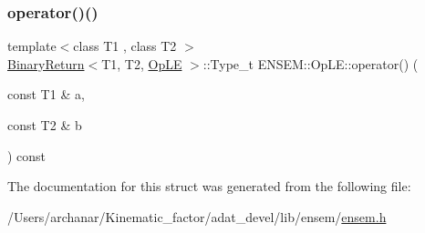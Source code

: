 \mbox{\label{structENSEM_1_1OpLE_aecbfd8b265536bef6bc1dc2a124858ae}} 
\subsubsection{\texorpdfstring{operator()()}{operator()()}\hspace{0.1cm}{\footnotesize\ttfamily [2/2]}}
{\footnotesize\ttfamily template$<$class T1 , class T2 $>$ \\
\mbox{\hyperlink{structENSEM_1_1BinaryReturn}{Binary\+Return}}$<$T1, T2, \mbox{\hyperlink{structENSEM_1_1OpLE}{Op\+LE}} $>$\+::Type\+\_\+t E\+N\+S\+E\+M\+::\+Op\+L\+E\+::operator() (\begin{DoxyParamCaption}\item[{const T1 \&}]{a,  }\item[{const T2 \&}]{b }\end{DoxyParamCaption}) const\hspace{0.3cm}{\ttfamily [inline]}}



The documentation for this struct was generated from the following file\+:\begin{DoxyCompactItemize}
\item 
/\+Users/archanar/\+Kinematic\+\_\+factor/adat\+\_\+devel/lib/ensem/\mbox{\hyperlink{lib_2ensem_2ensem_8h}{ensem.\+h}}\end{DoxyCompactItemize}
